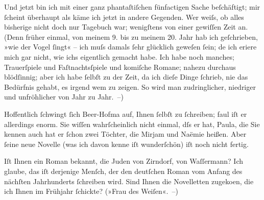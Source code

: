 \pstart
           Und jetzt bin ich mit einer ganz phantaſtiſchen {\pb}fünfactigen Sache
               beſchäftigt; mir ſcheint überhaupt als käme ich jetzt in andere Gegenden. Wer weiſs,
               ob alles bisherige nicht doch nur Tagebuch war; wenigſtens von einer gewiſſen Zeit
               an. (Denn früher einmal, von meinem 9. bis zu meinem 20. Jahr hab ich geſchrieben,
               »wie der Vogel ſingt« – ich muſs damals ſehr glücklich geweſen ſein; de{\geminationn} ich eri{\geminationn}ere mich gar
               nicht, wie ichs eigentlich gemacht habe. Ich habe noch manches; Trauerſpiele und
               Faſtnachtsſpiele und {\pb}komiſche Romane; nahezu
               durchaus blödſinnig; aber ich habe ſelbſt zu der Zeit, da ich dieſe Dinge ſchrieb,
               nie das Bedürfnis gehabt, es irgend wem zu zeigen. So wird man zudringlicher,
               niedriger und unfröhlicher von Jahr zu Jahr. –)\pend
           
\pstart
           Hoffentlich ſchwingt ſich Beer-Hofma{\geminationn} auf, Ihnen ſelbſt zu ſchreiben; faul iſt er allerdings enorm. Sie wiſſen
               wahrſcheinlich nicht einmal, dſs er \label{K_L00880-3v}\label{K_L00880-3} hat, Paula, die Sie kennen {\pb}auch hat er ſchon
               zwei Töchter, die Mirjam und Naëmie heißen. Aber ſeine neue Novelle (was ich davon kenne iſt wunderſchön) iſt noch
               nicht fertig.\pend
           
\pstart
           Iſt Ihnen ein Roman bekannt, die Juden von
                  Zirndorf, von Waſſermann? Ich glaube,
               das iſt derjenige Menſch, der den \introOben{}deutſchen\introOben{} Roman vom Anfang
               des nächſten Jahrhunderts ſchreiben wird. Sind Ihnen die Novelletten zugeko{\geminationm}en, die ich Ihnen im Frühjahr ſchickte? {\pb}(»Frau des
                  Weiſen«. –)\pend
           
